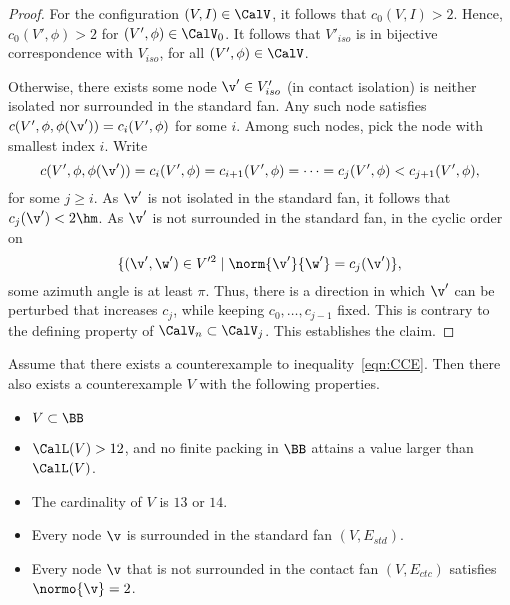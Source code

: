 \begin{proof}
For the configuration $(V,I)\in \CalV$, it follows that $c_0(V,I) >2$.
Hence, $c_0(V',\phi)>2$ for $(V',\phi)\in\CalV_0$.  It follows
that $V'_{iso}$ is in bijective correspondence with
$V_{iso}$, for all $(V',\phi)\in \CalV$.

Otherwise, there exists some node $\v'\in V'_{iso}$ (in contact
isolation) is neither isolated nor surrounded in the standard fan.
Any such node satisfies $c(V',\phi,\phi(\v'))=c_i(V',\phi)$ for some
$i$.  Among such nodes, pick the node with smallest index $i$.
Write
\begin{displaymath}
  c(V',\phi,\phi(\v')) = c_i(V',\phi) = c_{i+1}(V',\phi) 
=\cdots= c_j(V',\phi) < c_{j+1}(V',\phi),
\end{displaymath}
for some $j\ge i$.  As $\v'$ is not isolated in the standard fan, it
follows that $c_j(\v') < 2\hm$.  As $\v'$ is not surrounded in the
standard fan, in the cyclic order on
\begin{displaymath}
\{(\v',\w')\in V'^2 \mid \norm{\v'}{\w'} = c_j(\v')\},
\end{displaymath}
some azimuth angle is at least $\pi$.
Thus, there is a direction in which $\v'$ can be perturbed
that increases $c_j$, while keeping $c_0,\ldots,c_{j-1}$
fixed.  This is contrary to the defining property of
$\CalV_n\subset\CalV_j$.  This establishes the claim.
\end{proof}



\begin{lemma}\label{lemma:CE} 
  Assume that there exists a counterexample to
  inequality~\ref{eqn:CCE}.  Then there also exists a counterexample
  $V$ with the following properties.
\begin{itemize}
\item $V\subset \BB$
\item $\CalL(V) > 12$, and no finite packing in $\BB$ attains a value
  larger than $\CalL(V)$.
\item The cardinality of $V$ is $13$ or $14$.
\item Every node $\v$ is surrounded in the standard fan $(V,E_{std})$.
\item Every node $\v$ that is not surrounded in the contact
fan $(V,E_{ctc})$ satisfies $\normo{\v}=2$.
\end{itemize}
\end{lemma}

